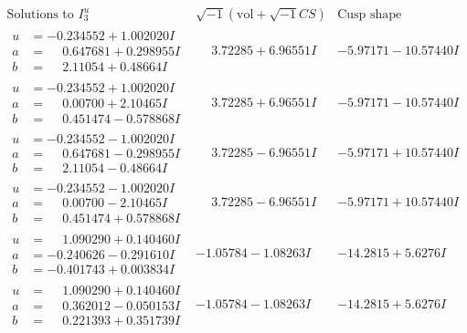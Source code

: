 \documentclass[1p]{elsarticle_modified}
\theoremstyle{definition}
\newcommand{\I}{\sqrt{-1}}
\begin{document}
$$\begin{array}{c|c|c}  
\text{Solutions to }I^u_{3}& \I (\text{vol} + \sqrt{-1}CS) & \text{Cusp shape}\\
 \hline 
\begin{aligned}
u &= -0.234552 + 1.002020 I \\
a &= \phantom{-}0.647681 + 0.298955 I \\
b &= \phantom{-}2.11054 + 0.48664 I\end{aligned}
 & \phantom{-}3.72285 + 6.96551 I & -5.97171 - 10.57440 I \\ \hline\begin{aligned}
u &= -0.234552 + 1.002020 I \\
a &= \phantom{-}0.00700 + 2.10465 I \\
b &= \phantom{-}0.451474 - 0.578868 I\end{aligned}
 & \phantom{-}3.72285 + 6.96551 I & -5.97171 - 10.57440 I \\ \hline\begin{aligned}
u &= -0.234552 - 1.002020 I \\
a &= \phantom{-}0.647681 - 0.298955 I \\
b &= \phantom{-}2.11054 - 0.48664 I\end{aligned}
 & \phantom{-}3.72285 - 6.96551 I & -5.97171 + 10.57440 I \\ \hline\begin{aligned}
u &= -0.234552 - 1.002020 I \\
a &= \phantom{-}0.00700 - 2.10465 I \\
b &= \phantom{-}0.451474 + 0.578868 I\end{aligned}
 & \phantom{-}3.72285 - 6.96551 I & -5.97171 + 10.57440 I \\ \hline\begin{aligned}
u &= \phantom{-}1.090290 + 0.140460 I \\
a &= -0.240626 - 0.291610 I \\
b &= -0.401743 + 0.003834 I\end{aligned}
 & -1.05784 - 1.08263 I & -14.2815 + 5.6276 I \\ \hline\begin{aligned}
u &= \phantom{-}1.090290 + 0.140460 I \\
a &= \phantom{-}0.362012 - 0.050153 I \\
b &= \phantom{-}0.221393 + 0.351739 I\end{aligned}
 & -1.05784 - 1.08263 I & -14.2815 + 5.6276 I \\ \hline\begin{aligned}

\end{aligned}
\end{array}$$
\end{document}
